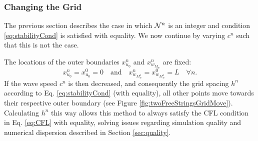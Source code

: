 \subsubsection{Changing the Grid}\label{sec:changingGrid}
The previous section describes the case in which $\mathcal{N}^n$ is an integer and condition \eqref{eq:stabilityCond} is satisfied with equality. %
We now continue by varying $c^n$ such that this is not the case.

The locations of the outer boundaries $x_{u_0}^n$ and $x_{w_{M_w}}^n$ are fixed:
\begin{equation*}
    x_{u_0}^n = x_{u_0}^0 = 0 \quad \text{and}\quad x_{w_{M_w^n}}^n = x_{w_{M_w^n}}^0 = L \quad \forall n.
\end{equation*}
If the wave speed $c^n$ is then decreased, and consequently the grid spacing $h^n$ according to Eq. \eqref{eq:stabilityCond} (with equality), all other points move towards their respective outer boundary (see Figure \ref{fig:twoFreeStringsGridMove}). Calculating $h^n$ this way allows this method to always satisfy the CFL condition in Eq. \eqref{eq:CFL} with equality, solving issues regarding simulation quality and numerical dispersion described in Section \ref{sec:quality}. %


